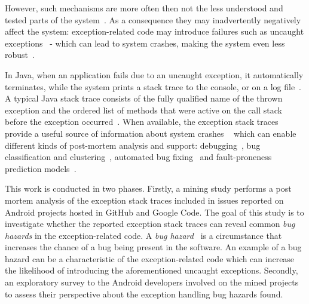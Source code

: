However, such mechanisms are more often then not the less 
understood and tested parts of the system~\cite{miller1997issues,Robil00,shah2010understanding, 
garcia2007extracting,garcia2001comparative,cabral2007exception,coelho2011unveiling,yuan:2014.osdi}.
As a consequence they may inadvertently negatively affect the system: exception-related code may introduce failures such as 
uncaught exceptions~\cite{jo2004uncaught, Zhang12} - 
which can lead to system crashes, making the system even less robust~\cite{coelho2011unveiling}.

In Java, when an application fails due to an uncaught exception, 
it automatically terminates, while the system prints a stack trace to the console, 
or on a log file~\cite{gosling2000java}.  A typical Java stack trace consists of  the fully qualified name 
of the thrown exception and the ordered list of methods that were active on the call stack before 
the exception occurred~\cite{gosling2000java,bloch2008effective}.
When available, the exception stack traces provide a useful source of information about system crashes ~\cite{bettenburg2008makes} which 
can enable different kinds of post-mortem analysis and support:  debugging~\cite{schroter2010stack}, 
bug classification and clustering~\cite{wang2013improving, kim2011crash, dhaliwal2011classifying},  
automated bug fixing~\cite{sinha2009fault} and fault-proneness prediction models~\cite{kim2013predicting}. 



This work is conducted in two phases. Firstly, a mining study performs a post 
mortem analysis of the exception stack traces 
included in issues reported on Android projects hosted in GitHub and Google Code.
The goal of this study is to investigate whether the reported exception stack traces
 can reveal common \emph{bug hazards} in the exception-related code.  
A \emph{bug hazard}~\cite{binder2000testing}  is a circumstance that increases the 
chance of a bug being present in the software. An example of a bug hazard can 
be a characteristic of  the exception-related code which can increase the likelihood 
of introducing the aforementioned uncaught exceptions.
Secondly, an exploratory survey to the Android developers involved on the mined projects
to assess their perspective about the exception handling bug hazards found.

